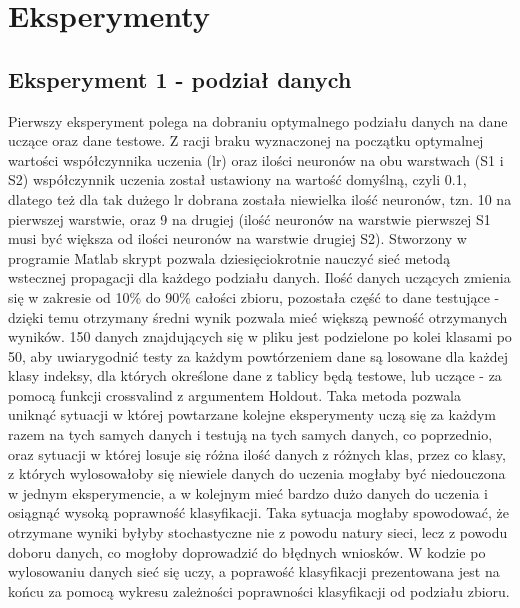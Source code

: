 \documentclass[a4paper, 12pt]{article}
\begin{document}
\newpage
\section{Eksperymenty}
\subsection{Eksperyment 1 - podział danych}
Pierwszy eksperyment polega na dobraniu optymalnego podziału danych na dane uczące oraz dane testowe. Z racji braku wyznaczonej na początku optymalnej wartości współczynnika uczenia (lr) oraz ilości neuronów na obu warstwach (S1 i S2) współczynnik uczenia został ustawiony na wartość domyślną, czyli 0.1, dlatego też dla tak dużego lr dobrana została niewielka ilość neuronów, tzn. 10 na pierwszej warstwie, oraz 9 na drugiej (ilość neuronów na warstwie pierwszej S1 musi być większa od ilości neuronów na warstwie drugiej S2).
Stworzony w programie Matlab skrypt pozwala dziesięciokrotnie nauczyć sieć metodą wstecznej propagacji \cite{str2} dla każdego podziału danych. Ilość danych uczących zmienia się w zakresie od 10\% do 90\% całości zbioru, pozostała część to dane testujące - dzięki temu otrzymany średni wynik pozwala mieć większą pewność otrzymanych wyników. 150 danych znajdujących się w pliku jest podzielone po kolei klasami po 50, aby uwiarygodnić testy za każdym powtórzeniem dane są losowane dla każdej klasy indeksy, dla których określone dane z tablicy będą testowe, lub uczące - za pomocą funkcji crossvalind z argumentem Holdout\cite{str1}. Taka metoda pozwala uniknąć sytuacji w której powtarzane kolejne eksperymenty uczą się za każdym razem na tych samych danych i testują na tych samych danych, co poprzednio, oraz sytuacji w której losuje się różna ilość danych z różnych klas, przez co klasy, z których wylosowałoby się niewiele danych do uczenia mogłaby być niedouczona w jednym eksperymencie, a w kolejnym mieć bardzo dużo danych do uczenia i osiągnąć wysoką poprawność klasyfikacji. Taka sytuacja mogłaby spowodować, że otrzymane wyniki byłyby stochastyczne nie z powodu natury sieci, lecz z powodu doboru danych, co mogłoby doprowadzić do błędnych wniosków.
W kodzie po wylosowaniu danych sieć się uczy, a poprawość klasyfikacji prezentowana jest na końcu za pomocą wykresu zależności poprawności klasyfikacji od podziału zbioru.
 
\end{document}
